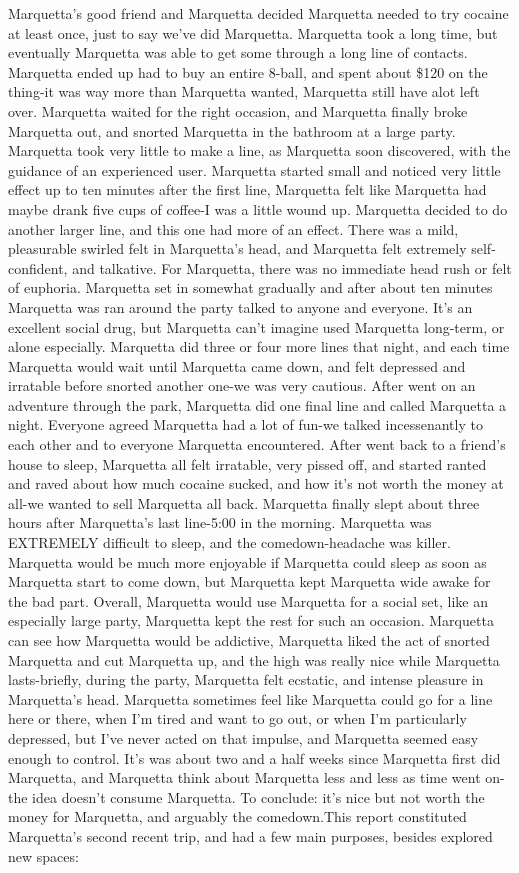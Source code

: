 \documentclass[12pt]{book}
\begin{document}
Marquetta's good friend and Marquetta decided Marquetta needed to try cocaine at least once, just to say we've did Marquetta. Marquetta took a long time, but eventually Marquetta was able to get some through a long line of contacts. Marquetta ended up had to buy an entire 8-ball, and spent about \$120 on the thing-it was way more than Marquetta wanted, Marquetta still have alot left over. Marquetta waited for the right occasion, and Marquetta finally broke Marquetta out, and snorted Marquetta in the bathroom at a large party. Marquetta took very little to make a line, as Marquetta soon discovered, with the guidance of an experienced user. Marquetta started small and noticed very little effect up to ten minutes after the first line, Marquetta felt like Marquetta had maybe drank five cups of coffee-I was a little wound up. Marquetta decided to do another larger line, and this one had more of an effect. There was a mild, pleasurable swirled felt in Marquetta's head, and Marquetta felt extremely self-confident, and talkative. For Marquetta, there was no immediate head rush or felt of euphoria. Marquetta set in somewhat gradually and after about ten minutes Marquetta was ran around the party talked to anyone and everyone. It's an excellent social drug, but Marquetta can't imagine used Marquetta long-term, or alone especially. Marquetta did three or four more lines that night, and each time Marquetta would wait until Marquetta came down, and felt depressed and irratable before snorted another one-we was very cautious. After went on an adventure through the park, Marquetta did one final line and called Marquetta a night. Everyone agreed Marquetta had a lot of fun-we talked incessenantly to each other and to everyone Marquetta encountered. After went back to a friend's house to sleep, Marquetta all felt irratable, very pissed off, and started ranted and raved about how much cocaine sucked, and how it's not worth the money at all-we wanted to sell Marquetta all back. Marquetta finally slept about three hours after Marquetta's last line-5:00 in the morning. Marquetta was EXTREMELY difficult to sleep, and the comedown-headache was killer. Marquetta would be much more enjoyable if Marquetta could sleep as soon as Marquetta start to come down, but Marquetta kept Marquetta wide awake for the bad part. Overall, Marquetta would use Marquetta for a social set, like an especially large party, Marquetta kept the rest for such an occasion. Marquetta can see how Marquetta would be addictive, Marquetta liked the act of snorted Marquetta and cut Marquetta up, and the high was really nice while Marquetta lasts-briefly, during the party, Marquetta felt ecstatic, and intense pleasure in Marquetta's head. Marquetta sometimes feel like Marquetta could go for a line here or there, when I'm tired and want to go out, or when I'm particularly depressed, but I've never acted on that impulse, and Marquetta seemed easy enough to control. It's was about two and a half weeks since Marquetta first did Marquetta, and Marquetta think about Marquetta less and less as time went on- the idea doesn't consume Marquetta. To conclude: it's nice but not worth the money for Marquetta, and arguably the comedown.This report constituted Marquetta's second recent trip, and had a few main purposes, besides explored new spaces: 
\end{document}
